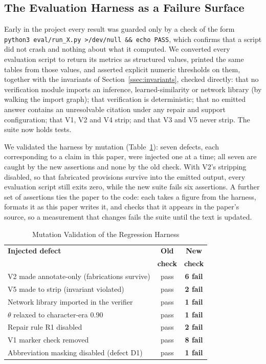 \documentclass[conference]{IEEEtran}
\begin{document}
\subsection{The Evaluation Harness as a Failure Surface}
\label{ssec:harness}

Early in the project every result was guarded only by a check of the form \texttt{python3 eval/run\_X.py >/dev/null \&\& echo PASS}, which confirms that a script did not crash and nothing about what it computed. We converted every evaluation script to return its metrics as structured values, printed the same tables from those values, and asserted explicit numeric thresholds on them, together with the invariants of Section~\ref{ssec:invariants}, checked directly: that no verification module imports an inference, learned-similarity or network library (by walking the import graph); that verification is deterministic; that no emitted answer contains an unresolvable citation under any repair and support configuration; that V1, V2 and V4 strip; and that V3 and V5 never strip. The suite now holds \TestCount{} tests.

We validated the harness by mutation (Table~\ref{tab:mutation}): seven defects, each corresponding to a claim in this paper, were injected one at a time; all seven are caught by the new assertions and none by the old check. With V2's stripping disabled, so that fabricated provisions survive into the emitted output, every evaluation script still exits zero, while the new suite fails six assertions. A further set of assertions ties the paper to the code: each takes a figure from the harness, formats it as this paper writes it, and checks that it appears in the paper's source, so a measurement that changes fails the suite until the text is updated.

\begin{table}[t]
\caption{Mutation Validation of the Regression Harness}
\label{tab:mutation}
\centering
\footnotesize
\begin{tabular}{@{}lcc@{}}
\toprule
\textbf{Injected defect} & \textbf{Old} & \textbf{New} \\
                         & \textbf{check} & \textbf{check} \\
\midrule
V2 made annotate-only (fabrications survive) & pass & \textbf{6 fail} \\
V5 made to strip (invariant violated)        & pass & \textbf{2 fail} \\
Network library imported in the verifier     & pass & \textbf{1 fail} \\
$\theta$ relaxed to character-era 0.90       & pass & \textbf{1 fail} \\
Repair rule R1 disabled                      & pass & \textbf{2 fail} \\
V1 marker check removed                      & pass & \textbf{8 fail} \\
Abbreviation masking disabled (defect D1)    & pass & \textbf{1 fail} \\
\bottomrule
\end{tabular}
\end{table}
\end{document}
